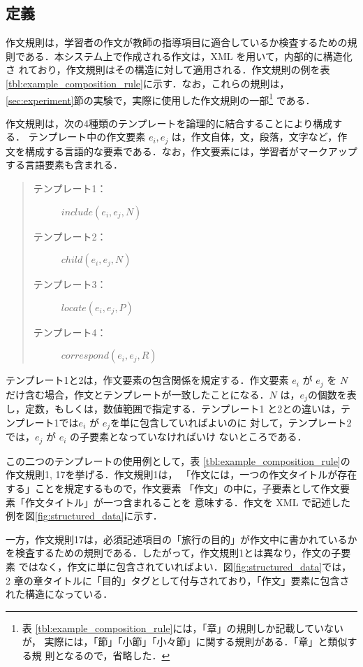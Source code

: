 \documentclass[japanese]{jnlp_1.4}
\begin{document}
\subsection{定義}

作文規則は，学習者の作文が教師の指導項目に適合しているか検査するための規
則である．本システム上で作成される作文は，XML を用いて，内部的に構造化さ
れており，作文規則はその構造に対して適用される．作文規則の例を表
\ref{tbl:example_composition_rule}に示す．なお，これらの規則は，
\ref{sec:experiment}節の実験で，実際に使用した作文規則の一部\footnote{表
\ref{tbl:example_composition_rule}には，「章」の規則しか記載していないが，
実際には，「節」「小節」「小々節」に関する規則がある．「章」と類似する規
則となるので，省略した．}
である．

作文規則は，次の4種類のテンプレートを論理的に結合することにより構成する．
テンプレート中の作文要素 $e_i, e_j$ は，作文自体，文，段落，文字など，作
文を構成する言語的な要素である．なお，作文要素には，学習者がマークアップ
する言語要素も含まれる．


\begin{quote}
\begin{description}
 \item[テンプレート1：] $include(e_i, e_j, N)$
 \item[テンプレート2：] $child(e_i, e_j, N)$
 \item[テンプレート3：] $locate(e_i, e_j, P)$
 \item[テンプレート4：] $correspond(e_i, e_j, R)$
\end{description}
\end{quote}

テンプレート1と2は，作文要素の包含関係を規定する．作文要素 $e_i$ が 
$e_j$ を $N$ だけ含む場合，作文とテンプレートが一致したことになる．$N$ 
は，$e_j$の個数を表し，定数，もしくは，数値範囲で指定する．テンプレート1
と2との違いは，テンプレート1では$e_i$ が $e_j$を単に包含していればよいのに
対して，テンプレート2では，$e_j$ が $e_i$ の子要素となっていなければいけ
ないところである．

この二つのテンプレートの使用例として，表
\ref{tbl:example_composition_rule}の作文規則1, 17を挙げる．作文規則1は，
「作文には，一つの作文タイトルが存在する」ことを規定するもので，作文要素
「作文」の中に，子要素として作文要素「作文タイトル」が一つ含まれることを
意味する．作文を XML で記述した例を図\ref{fig:structured_data}に示す．

一方，作文規則17は，必須記述項目の「旅行の目的」が作文中に書かれているか
を検査するための規則である．したがって，作文規則1とは異なり，作文の子要素
ではなく，作文に単に包含されていればよい．図\ref{fig:structured_data}では，
2 章の章タイトルに「目的」タグとして付与されており，「作文」要素に包含さ
れた構造になっている．
\end{document}
